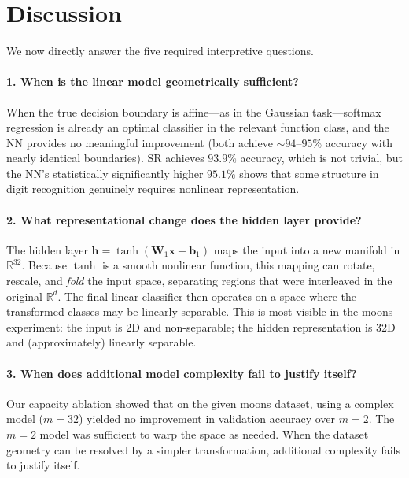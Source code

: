 \documentclass[11pt]{article}
\newcommand{\R}{\mathbb{R}}
\newcommand{\vx}{\mathbf{x}}
\newcommand{\vh}{\mathbf{h}}
\begin{document}
\section{Discussion}

We now directly answer the five required interpretive questions.

\paragraph{1. When is the linear model geometrically sufficient?}
When the true decision boundary is affine---as in the Gaussian task---softmax regression
is already an optimal classifier in the relevant function class, and the NN provides no
meaningful improvement (both achieve $\sim 94$--$95\%$ accuracy with nearly identical
boundaries).
SR achieves $93.9\%$ accuracy, which is not trivial, but the NN's
statistically significantly higher $95.1\%$ shows that some structure in digit
recognition genuinely requires nonlinear representation.

\paragraph{2. What representational change does the hidden layer provide?}
The hidden layer $\vh = \tanh(\mathbf{W}_1 \vx + \mathbf{b}_1)$ maps the input into
a new manifold in $\R^{32}$.
Because $\tanh$ is a smooth nonlinear function, this mapping can rotate, rescale, and
\emph{fold} the input space, separating regions that were interleaved in the original
$\R^d$.
The final linear classifier then operates on a space where the transformed classes
may be linearly separable.
This is most visible in the moons experiment: the input is 2D and non-separable; the
hidden representation is 32D and (approximately) linearly separable.

\paragraph{3. When does additional model complexity fail to justify itself?}
Our capacity ablation showed that on the given moons dataset, using a complex model ($m=32$) yielded no improvement in validation accuracy over $m=2$. The $m=2$ model was sufficient to warp the space as needed. When the dataset geometry can be resolved by a simpler transformation, additional complexity fails to justify itself.
\end{document}
